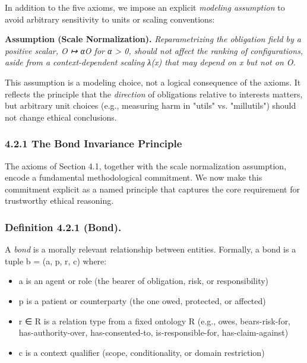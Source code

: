 \documentclass[12pt]{article}
\theoremstyle{plain}
\theoremstyle{definition}
\theoremstyle{remark}
\begin{document}
In addition to the five axioms, we impose an explicit \emph{modeling
assumption} to avoid arbitrary sensitivity to units or scaling
conventions:

\textbf{Assumption (Scale Normalization).} \emph{Reparametrizing the
obligation field by a positive scalar, O ↦ αO for α \textgreater{} 0,
should not affect the ranking of configurations, aside from a
context-dependent scaling λ(x) that may depend on x but not on O.}

This assumption is a modeling choice, not a logical consequence of the
axioms. It reflects the principle that the \emph{direction} of
obligations relative to interests matters, but arbitrary unit choices
(e.g., measuring harm in "utils" vs. "millutils") should not change
ethical conclusions.

\subsubsection{4.2.1 The Bond Invariance
Principle}\label{the-bond-invariance-principle}

The axioms of Section 4.1, together with the scale normalization
assumption, encode a fundamental methodological commitment. We now make
this commitment explicit as a named principle that captures the core
requirement for trustworthy ethical reasoning.

\subsubsection{\texorpdfstring{Definition 4.2.1 (Bond).
}{Definition 4.2.1 (Bond). }}\label{definition-4.2.1-bond.}

A \emph{bond} is a morally relevant relationship between entities.
Formally, a bond is a tuple b = (a, p, r, c) where:

\begin{itemize}
\item
  a is an agent or role (the bearer of obligation, risk, or
  responsibility)
\item
  p is a patient or counterparty (the one owed, protected, or affected)
\item
  r ∈ R is a relation type from a fixed ontology R (e.g., owes,
  bears-risk-for, has-authority-over, has-consented-to,
  is-responsible-for, has-claim-against)
\item
  c is a context qualifier (scope, conditionality, or domain
  restriction)
\end{itemize}
\end{document}
